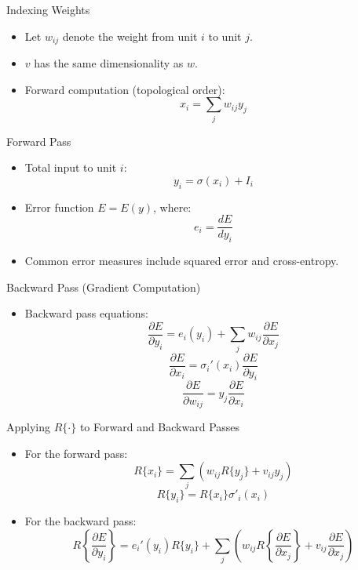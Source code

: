 \documentclass{beamer}
\begin{document}
\begin{frame}{Indexing Weights}
    \begin{itemize}
        \item Let \( w_{ij} \) denote the weight from unit \( i \) to unit \( j \).
        \item \( v \) has the same dimensionality as \( w \).
        \item Forward computation (topological order):
        \[
        x_i = \sum_j w_{ij} y_j
        \]
    \end{itemize}
\end{frame}

\begin{frame}{Forward Pass}
    \begin{itemize}
        \item Total input to unit \( i \):
        \[
        y_i = \sigma(x_i) + I_i
        \]
        \item Error function \( E = E(y) \), where:
        \[
        e_i = \frac{dE}{dy_i}
        \]
        \item Common error measures include squared error and cross-entropy.
    \end{itemize}
\end{frame}

\begin{frame}{Backward Pass (Gradient Computation)}
    \begin{itemize}
        \item Backward pass equations:
        \[
        \frac{\partial E}{\partial y_i} = e_i(y_i) + \sum_j w_{ij} \frac{\partial E}{\partial x_j}
        \]
        \[
        \frac{\partial E}{\partial x_i} = \sigma_i'(x_i) \frac{\partial E}{\partial y_i}
        \]
        \[
        \frac{\partial E}{\partial w_{ij}} = y_j \frac{\partial E}{\partial x_i}
        \]
    \end{itemize}
\end{frame}

\begin{frame}{Applying \( R\{\cdot\} \) to Forward and Backward Passes}
    \begin{itemize}
        \item For the forward pass:
        \[
        R\{x_i\} = \sum_j \left( w_{ij} R\{y_j\} + v_{ij} y_j \right)
        \]
        \[
        R\{y_i\} = R\{x_i\} \sigma'_i(x_i)
        \]
        \item For the backward pass:
        \[
        R\left\{ \frac{\partial E}{\partial y_i} \right\} = e_i'(y_i) R\{y_i\} + \sum_j \left( w_{ij} R\left\{ \frac{\partial E}{\partial x_j} \right\} + v_{ij} \frac{\partial E}{\partial x_j} \right)
        \]
    \end{itemize}
\end{frame}
\end{document}
